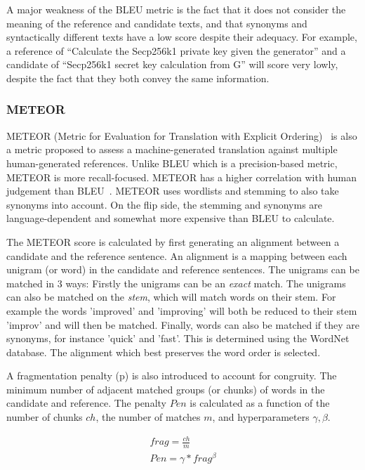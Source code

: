 A major weakness of the BLEU metric is the fact that it does not consider the meaning of the reference and candidate texts, and that synonyms and syntactically different texts have a low score despite their adequacy. For example, a reference of ``Calculate the Secp256k1 private key given the generator'' and a candidate of ``Secp256k1 secret key calculation from G'' will score very lowly, despite the fact that they both convey the same information. 

\subsubsection{METEOR}
METEOR (Metric for Evaluation for Translation with Explicit Ordering)~\cite{Meteor} is also a metric proposed to assess a machine-generated translation against multiple human-generated references. Unlike BLEU which is a precision-based metric, METEOR is more recall-focused. METEOR has a higher correlation with human judgement than BLEU~\cite{recommend_summarization}. METEOR uses wordlists and stemming to also take synonyms into account. On the flip side, the stemming and synonyms are language-dependent and somewhat more expensive than BLEU to calculate.

The METEOR score is calculated by first generating an alignment between a candidate and the reference sentence. An alignment is a mapping between each unigram (or word) in the candidate and reference sentences. The unigrams can be matched in 3 ways: Firstly the unigrams can be an \textit{exact} match. The unigrams can also be matched on the \textit{stem}, which will match words on their stem. For example the words 'improved' and 'improving' will both be reduced to their stem 'improv' and will then be matched. Finally, words can also be matched if they are synonyms, for instance 'quick' and 'fast'. This is determined using the WordNet~\cite{wordnet} database. The alignment which best preserves the word order is selected. 

A fragmentation penalty (p) is also introduced to account for congruity. The minimum number of adjacent matched groups (or chunks) of words in the candidate and reference. The penalty \(\mathit{Pen}\) is calculated as a function of the number of chunks \(ch\), the number of matches \(m\), and hyperparameters \(\gamma, \beta\).

\begin{equation}
\begin{aligned}
frag = \frac{ch}{m} \\
Pen = \gamma * frag^{\beta}
\end{aligned}
\end{equation}


